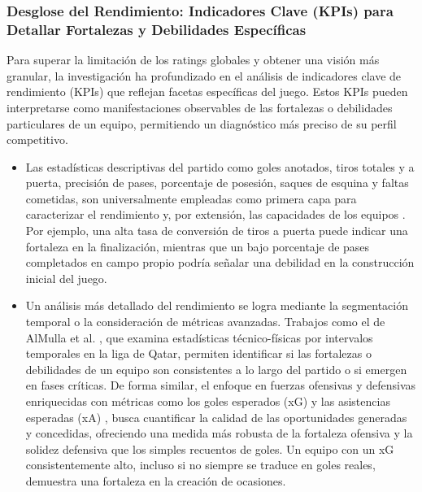 \subsubsection{Desglose del Rendimiento: Indicadores Clave (KPIs) para Detallar Fortalezas y Debilidades Específicas}

Para superar la limitación de los ratings globales y obtener una visión más granular, la investigación ha profundizado en el análisis de indicadores clave de rendimiento (KPIs) que reflejan facetas específicas del juego. Estos KPIs pueden interpretarse como manifestaciones observables de las fortalezas o debilidades particulares de un equipo, permitiendo un diagnóstico más preciso de su perfil competitivo.
\begin{itemize}
    \item Las estadísticas descriptivas del partido como goles anotados, tiros totales y a puerta, precisión de pases, porcentaje de posesión, saques de esquina y faltas cometidas, son universalmente empleadas como primera capa para caracterizar el rendimiento y, por extensión, las capacidades de los equipos \cite{mPredictingOutcomeFuture2023, liPassingWinUsing2021, koningBettingMarketEfficiency2023}. Por ejemplo, una alta tasa de conversión de tiros a puerta puede indicar una fortaleza en la finalización, mientras que un bajo porcentaje de pases completados en campo propio podría señalar una debilidad en la construcción inicial del juego.
    \item Un análisis más detallado del rendimiento se logra mediante la segmentación temporal o la consideración de métricas avanzadas. Trabajos como el de AlMulla et al. \cite{alMullaSoccerNetGatedRecurrent2023}, que examina estadísticas técnico-físicas por intervalos temporales en la liga de Qatar, permiten identificar si las fortalezas o debilidades de un equipo son consistentes a lo largo del partido o si emergen en fases críticas. De forma similar, el enfoque en fuerzas ofensivas y defensivas enriquecidas con métricas como los goles esperados (xG) y las asistencias esperadas (xA) \cite{koopmanForecastingFootballMatch2019, alvarezDataScienceApproach2024, wheatcroftForecastingFootballMatches2021}, busca cuantificar la calidad de las oportunidades generadas y concedidas, ofreciendo una medida más robusta de la fortaleza ofensiva y la solidez defensiva que los simples recuentos de goles. Un equipo con un xG consistentemente alto, incluso si no siempre se traduce en goles reales, demuestra una fortaleza en la creación de ocasiones.

\end{itemize}
